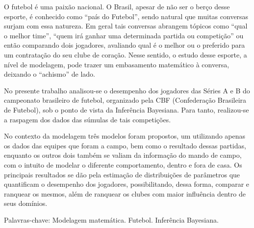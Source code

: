 \setlength{\absparsep}{18pt} 
\begin{resumo}[Resumo]

O futebol é uma paixão nacional. O Brasil, apesar de não ser o berço desse esporte, é conhecido como ``país do Futebol'', sendo natural que muitas conversas surjam com essa natureza. Em geral tais conversas abrangem tópicos como ``qual o melhor time'', ``quem irá ganhar uma determinada partida ou competição'' ou então comparando dois jogadores, avaliando qual é o melhor ou o preferido para um contratação do seu clube de coração. Nesse sentido, o estudo desse esporte, a nível de modelagem, pode trazer um embasamento matemático à conversa, deixando o ``achismo'' de lado.

No presente trabalho analisou-se o desempenho dos jogadores das Séries A e B do campeonato brasileiro de futebol, organizado pela CBF (Confederação Brasileira de Futebol), sob o ponto de vista da Inferência Bayesiana. Para tanto, realizou-se a raspagem dos dados das súmulas de tais competições.

No contexto da modelagem três modelos foram propostos, um utilizando apenas os dados das equipes que foram a campo, bem como o resultado dessas partidas, enquanto os outros dois também se valiam da informação do mando de campo, com o intuito de modelar o diferente comportamento, dentro e fora de casa. Os principais resultados se dão pela estimação de distribuições de parâmetros que quantificam o desempenho dos jogadores, possibilitando, dessa forma, comparar e ranquear os mesmos, além de ranquear os clubes com maior influência dentro de seus domínios.

Palavras-chave: Modelagem matemática. Futebol. Inferência Bayesiana.
\end{resumo}

